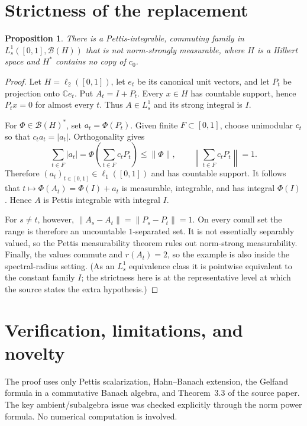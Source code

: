 \documentclass[11pt]{article}
\newtheorem{proposition}[theorem]{Proposition}
\theoremstyle{remark}
\newcommand{\B}{\mathcal B}
\newcommand{\C}{\mathbb C}
\begin{document}
\section{Strictness of the replacement}

\begin{proposition}
There is a Pettis-integrable, commuting family in
$L_s^1([0,1],\B(H))$ that is not norm-strongly measurable, where $H$ is a
Hilbert space and $H^*$ contains no copy of $c_0$.
\end{proposition}

\begin{proof}
Let $H=\ell_2([0,1])$, let $e_t$ be its canonical unit vectors, and let $P_t$
be projection onto $\C e_t$.  Put $A_t=I+P_t$.  Every $x\in H$ has countable
support, hence $P_tx=0$ for almost every $t$.  Thus $A\in L_s^1$ and its
strong integral is $I$.

For $\Phi\in\B(H)^*$, set $a_t=\Phi(P_t)$.  Given finite $F\subset[0,1]$,
choose unimodular $c_t$ so that $c_ta_t=|a_t|$.  Orthogonality gives
\[
 \sum_{t\in F}|a_t|
 =\Phi\!\left(\sum_{t\in F}c_tP_t\right)\leq\|\Phi\|,
 \qquad
 \left\|\sum_{t\in F}c_tP_t\right\|=1.
\]
Therefore $(a_t)_{t\in[0,1]}\in\ell_1([0,1])$ and has countable support.
It follows that $t\mapsto\Phi(A_t)=\Phi(I)+a_t$ is measurable, integrable,
and has integral $\Phi(I)$.  Hence $A$ is Pettis integrable with integral $I$.

For $s\neq t$, however, $\|A_s-A_t\|=\|P_s-P_t\|=1$.  On every conull set
the range is therefore an uncountable $1$-separated set.  It is not essentially
separably valued, so the Pettis measurability theorem rules out norm-strong
measurability.  Finally, the values commute and $r(A_t)=2$, so the example is
also inside the spectral-radius setting.  (As an $L_s^1$ equivalence class it
is pointwise equivalent to the constant family $I$; the strictness here is at
the representative level at which the source states the extra hypothesis.)
\end{proof}

\section{Verification, limitations, and novelty}

The proof uses only Pettis scalarization, Hahn--Banach extension, the Gelfand
formula in a commutative Banach algebra, and Theorem~3.3 of the source paper.
The key ambient/subalgebra issue was checked explicitly through the norm power
formula.  No numerical computation is involved.
\end{document}
